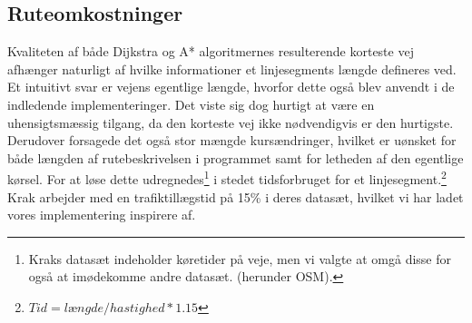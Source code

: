 \subsection{Ruteomkostninger}
\label{subsec:ruteomkostninger}
Kvaliteten af både Dijkstra og A* algoritmernes resulterende korteste vej afhænger naturligt af hvilke informationer et linjesegments længde defineres ved. Et intuitivt svar er vejens egentlige længde, hvorfor dette også blev anvendt i de indledende implementeringer. Det viste sig dog hurtigt at være en uhensigtsmæssig tilgang, da den korteste vej ikke nødvendigvis er den hurtigste. Derudover forsagede det også stor mængde kursændringer, hvilket er uønsket for både længden af rutebeskrivelsen i programmet samt for letheden af den egentlige kørsel. For at løse dette udregnedes\footnote{Kraks datasæt indeholder køretider på veje, men vi valgte at omgå disse for også at imødekomme andre datasæt. (herunder OSM).} i stedet tidsforbruget for et linjesegment.\footnote{$Tid=længde/hastighed*1.15$} Krak arbejder med en trafiktillægstid på 15\% i deres datasæt, hvilket vi har ladet vores implementering inspirere af.